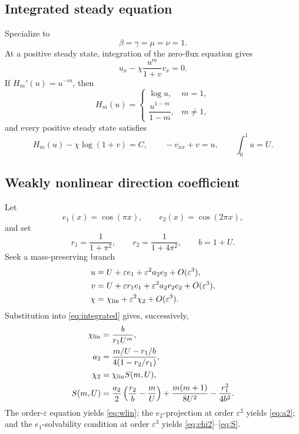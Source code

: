 \documentclass[11pt]{article}
\begin{document}
\subsection{Integrated steady equation}

Specialize to
\[
 \beta=\gamma=\mu=\nu=1.
\]
At a positive steady state, integration of the zero-flux equation gives
\[
 u_x-\chi\frac{u^m}{1+v}v_x=0.
\]
If \(H_m'(u)=u^{-m}\), then
\[
 H_m(u)=
 \begin{cases}
 \log u,&m=1,\\[1mm]
 \dfrac{u^{1-m}}{1-m},&m\ne1,
 \end{cases}
\]
and every positive steady state satisfies
\begin{equation}
 H_m(u)-\chi\log(1+v)=C,\qquad
 -v_{xx}+v=u,\qquad \int_0^1u=U.                       \label{eq:integrated}
\end{equation}

\subsection{Weakly nonlinear direction coefficient}

Let
\[
 e_1(x)=\cos(\pi x),\qquad e_2(x)=\cos(2\pi x),
\]
and set
\[
 r_1=\frac1{1+\pi^2},\qquad
 r_2=\frac1{1+4\pi^2},\qquad b=1+U.
\]
Seek a mass-preserving branch
\begin{align}
 u&=U+\varepsilon e_1+\varepsilon^2a_2e_2+O(\varepsilon^3), \label{eq:uexp}\\
 v&=U+\varepsilon r_1e_1+\varepsilon^2a_2r_2e_2
       +O(\varepsilon^3),                              \label{eq:vexp}\\
 \chi&=\chi_{\rm lin}+\varepsilon^2\chi_2
       +O(\varepsilon^3).                              \label{eq:chiexp}
\end{align}
Substitution into \eqref{eq:integrated} gives, successively,
\begin{align}
 \chi_{\rm lin}&=\frac{b}{r_1U^m},                     \label{eq:wlin}\\
 a_2&=\frac{m/U-r_1/b}{4(1-r_2/r_1)},                  \label{eq:a2}\\
 \chi_2&=\chi_{\rm lin}S(m,U),                         \label{eq:chi2}\\
 S(m,U)
 &=\frac{a_2}{2}\left(\frac{r_2}{b}-\frac mU\right)
   +\frac{m(m+1)}{8U^2}
   -\frac{r_1^2}{4b^2}.                               \label{eq:S}
\end{align}
The order-\(\varepsilon\) equation yields \eqref{eq:wlin}; the
\(e_2\)-projection at order \(\varepsilon^2\) yields \eqref{eq:a2}; and the
\(e_1\)-solvability condition at order \(\varepsilon^3\) yields
\eqref{eq:chi2}--\eqref{eq:S}.
\end{document}
